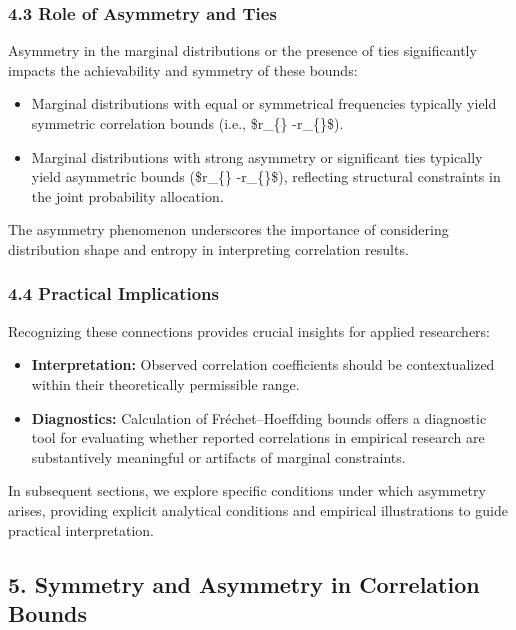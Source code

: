 \documentclass[
  12pt,
]{article}
\providecommand{\tightlist}{%
  \setlength{\itemsep}{0pt}\setlength{\parskip}{0pt}}\usepackage{longtable,booktabs,array}
\begin{document}
\subsubsection{4.3 Role of Asymmetry and
Ties}\label{role-of-asymmetry-and-ties}

Asymmetry in the marginal distributions or the presence of ties
significantly impacts the achievability and symmetry of these bounds:

\begin{itemize}
\tightlist
\item
  Marginal distributions with equal or symmetrical frequencies typically
  yield symmetric correlation bounds (i.e., \$r\_\{\}
  \approx -r\_\{\}\$).
\item
  Marginal distributions with strong asymmetry or significant ties
  typically yield asymmetric bounds (\$r\_\{\}
  \neq -r\_\{\}\$), reflecting structural constraints in the
  joint probability allocation.
\end{itemize}

The asymmetry phenomenon underscores the importance of considering
distribution shape and entropy in interpreting correlation results.

\subsubsection{4.4 Practical Implications}\label{practical-implications}

Recognizing these connections provides crucial insights for applied
researchers:

\begin{itemize}
\tightlist
\item
  \textbf{Interpretation:} Observed correlation coefficients should be
  contextualized within their theoretically permissible range.
\item
  \textbf{Diagnostics:} Calculation of Fréchet--Hoeffding bounds offers
  a diagnostic tool for evaluating whether reported correlations in
  empirical research are substantively meaningful or artifacts of
  marginal constraints.
\end{itemize}

In subsequent sections, we explore specific conditions under which
asymmetry arises, providing explicit analytical conditions and empirical
illustrations to guide practical interpretation.

\subsection{5. Symmetry and Asymmetry in Correlation
Bounds}\label{symmetry-and-asymmetry-in-correlation-bounds}
\end{document}
